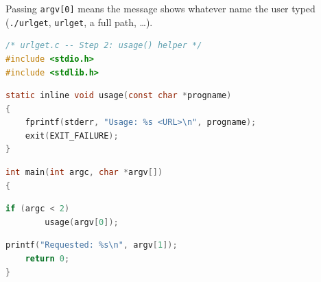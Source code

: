 Passing \texttt{argv[0]} means the message shows whatever name the user
typed (\texttt{./urlget}, \texttt{urlget}, a full path, \ldots).

\begin{lstlisting}[style=oldcode,language=C,firstnumber=1]
/* urlget.c -- Step 2: usage() helper */
#include <stdio.h>
#include <stdlib.h>
\end{lstlisting}
\begin{lstlisting}[style=newcode,language=C,firstnumber=last]
static inline void usage(const char *progname)
{
    fprintf(stderr, "Usage: %s <URL>\n", progname);
    exit(EXIT_FAILURE);
}
\end{lstlisting}
\begin{lstlisting}[style=oldcode,language=C,firstnumber=last]
int main(int argc, char *argv[])
{
\end{lstlisting}
\begin{lstlisting}[style=newcode,language=C,firstnumber=last]
    if (argc < 2)
        usage(argv[0]);
\end{lstlisting}
\begin{lstlisting}[style=oldcode,language=C,firstnumber=last]
    printf("Requested: %s\n", argv[1]);
    return 0;
}
\end{lstlisting}
\FullSourceStop
